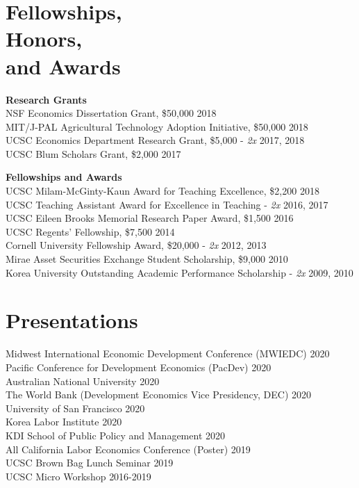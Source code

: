 \documentclass[letterpaper, margin, 10pt]{res} %
\begin{document}
\begin{resume}

\section{\sc \textbf{Fellowships, \\ Honors, \\ and Awards}}
{\bf Research Grants}\\
NSF Economics Dissertation Grant, \$50,000  \hfill{2018}\\
MIT/J-PAL Agricultural Technology Adoption Initiative, \$50,000   \hfill{2018}\\
UCSC Economics Department Research Grant, \$5,000 - \textit{2x}  \hfill{2017, 2018}\\
UCSC Blum Scholars Grant, \$2,000    \hfill{2017}

{\bf Fellowships and Awards}\\
UCSC Milam-McGinty-Kaun Award for Teaching Excellence, \$2,200  \hfill{2018}\\
UCSC Teaching Assistant Award for Excellence in Teaching -  \textit{2x}   \hfill{2016, 2017}\\
UCSC Eileen Brooks Memorial Research Paper Award, \$1,500  \hfill{2016}\\
UCSC Regents' Fellowship, \$7,500 \hfill{2014}\\
Cornell University Fellowship Award, \$20,000 -  \textit{2x} \hfill{2012, 2013}\\
Mirae Asset Securities Exchange Student Scholarship, \$9,000 \hfill{2010}\\
Korea University Outstanding Academic Performance Scholarship -  \textit{2x} \hfill{2009, 2010}


\section{Presentations}
Midwest International Economic Development Conference (MWIEDC)  \hfill{2020}\\
Pacific Conference for Development Economics (PacDev) \hfill{2020}\\
Australian National University \hfill{2020}\\
The World Bank (Development Economics Vice Presidency, DEC) \hfill{2020}\\
University of San Francisco \hfill{2020}\\
Korea Labor Institute \hfill{2020}\\
KDI School of Public Policy and Management \hfill{2020}\\
All California Labor Economics Conference (Poster)   \hfill{2019}\\
UCSC Brown Bag Lunch Seminar  \hfill{2019}\\
UCSC Micro Workshop \hfill{2016-2019}



\end{resume}
\end{document}
